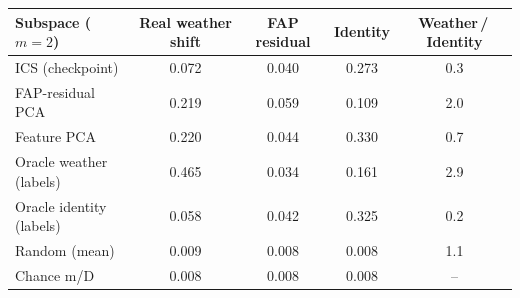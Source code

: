\begin{tabular}{lcccc}
\toprule
Subspace ($m{=}2$) & Real weather shift & FAP residual & Identity & Weather\,/\,Identity \\
\midrule
ICS (checkpoint) & 0.072 & 0.040 & 0.273 & 0.3 \\
FAP-residual PCA & 0.219 & 0.059 & 0.109 & 2.0 \\
Feature PCA & 0.220 & 0.044 & 0.330 & 0.7 \\
Oracle weather (labels) & 0.465 & 0.034 & 0.161 & 2.9 \\
Oracle identity (labels) & 0.058 & 0.042 & 0.325 & 0.2 \\
Random (mean) & 0.009 & 0.008 & 0.008 & 1.1 \\
Chance m/D & 0.008 & 0.008 & 0.008 & -- \\
\bottomrule
\end{tabular}
